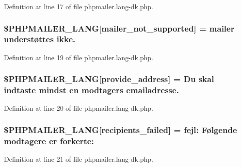 Definition at line 17 of file phpmailer.\+lang-\/dk.\+php.

\subsubsection[{\texorpdfstring{\$\+P\+H\+P\+M\+A\+I\+L\+E\+R\+\_\+\+L\+A\+NG}{$PHPMAILER_LANG}}]{\setlength{\rightskip}{0pt plus 5cm}\$P\+H\+P\+M\+A\+I\+L\+E\+R\+\_\+\+L\+A\+NG\mbox{[}\textquotesingle{}mailer\+\_\+not\+\_\+supported\textquotesingle{}\mbox{]} = \textquotesingle{} mailer understøttes ikke.\textquotesingle{}}\hypertarget{phpmailer_8lang-dk_8php_aa2ebcb8833ee83a7ad67401c4bb3a6ad}{}\label{phpmailer_8lang-dk_8php_aa2ebcb8833ee83a7ad67401c4bb3a6ad}


Definition at line 19 of file phpmailer.\+lang-\/dk.\+php.

\subsubsection[{\texorpdfstring{\$\+P\+H\+P\+M\+A\+I\+L\+E\+R\+\_\+\+L\+A\+NG}{$PHPMAILER_LANG}}]{\setlength{\rightskip}{0pt plus 5cm}\$P\+H\+P\+M\+A\+I\+L\+E\+R\+\_\+\+L\+A\+NG\mbox{[}\textquotesingle{}provide\+\_\+address\textquotesingle{}\mbox{]} = \textquotesingle{}Du skal indtaste mindst en modtagers emailadresse.\textquotesingle{}}\hypertarget{phpmailer_8lang-dk_8php_a8b97897c2406b7392b056f375feeefbb}{}\label{phpmailer_8lang-dk_8php_a8b97897c2406b7392b056f375feeefbb}


Definition at line 20 of file phpmailer.\+lang-\/dk.\+php.

\subsubsection[{\texorpdfstring{\$\+P\+H\+P\+M\+A\+I\+L\+E\+R\+\_\+\+L\+A\+NG}{$PHPMAILER_LANG}}]{\setlength{\rightskip}{0pt plus 5cm}\$P\+H\+P\+M\+A\+I\+L\+E\+R\+\_\+\+L\+A\+NG\mbox{[}\textquotesingle{}recipients\+\_\+failed\textquotesingle{}\mbox{]} =  fejl\+: Følgende modtagere er forkerte\+: \textquotesingle{}}\hypertarget{phpmailer_8lang-dk_8php_a7589d30bb9b368327c2df015f3e6bcba}{}\label{phpmailer_8lang-dk_8php_a7589d30bb9b368327c2df015f3e6bcba}


Definition at line 21 of file phpmailer.\+lang-\/dk.\+php.

